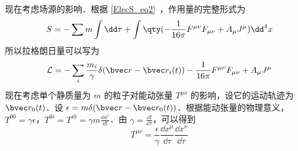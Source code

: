 现在考虑场源的影响．根据 \autoref{ElecS_eq2}~，作用量的完整形式为
\begin{equation}
S=-\sum{m\int \dd \tau}+\int \qty(-\frac{1}{16\pi}F^{\mu\nu}F_{\mu\nu}+A_\mu J^\mu ){\dd}^4 x
\end{equation}
所以拉格朗日量可以写为
\begin{equation}
\mathcal{L}=-\sum_i \frac{m_i}{\gamma}\delta(\bvec r-\bvec r_i(t))-\frac{1}{16\pi}F^{\mu\nu}F_{\mu\nu}+A_\mu J^\mu
\end{equation}
现在考虑单个静质量为 $m$ 的粒子对能动张量 $T^{\mu\nu}$ 的影响，设它的运动轨迹为 $\bvec r_0(t)$．设 $\epsilon=m\delta(\bvec r-\bvec r_0(t))$．根据能动张量的物理意义，$T^{00}=\gamma \epsilon$，$T^{0i}=T^{i0}=\gamma m \frac{\dd x^i}{\dd t}$．由 $\gamma=\frac{\dd t}{\dd \tau}$，可以得到
\begin{equation}
T^{\mu\nu}=\frac{\epsilon}{\gamma}\frac{\dd x^\mu}{\dd \tau}\frac{\dd x^\nu}{\dd \tau}
\end{equation}
